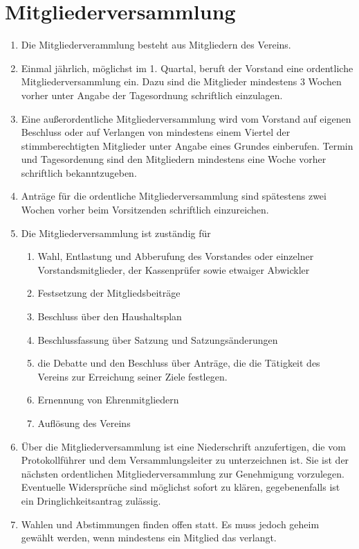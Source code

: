 \documentclass[11pt]{article}
\begin{document}
\section{Mitgliederversammlung}
\begin{enumerate}[label=\arabic*)]
	\item Die Mitgliederverammlung besteht aus Mitgliedern des Vereins.
	\item Einmal jährlich, möglichst im 1. Quartal, beruft der Vorstand eine ordentliche Mitgliederversammlung ein. Dazu sind die Mitglieder mindestens 3 Wochen vorher unter Angabe der Tagesordnung schriftlich einzulagen.
	\item Eine außerordentliche Mitgliederversammlung wird vom Vorstand auf eigenen Beschluss oder auf Verlangen von mindestens einem Viertel der stimmberechtigten Mitglieder unter Angabe eines Grundes einberufen. Termin und Tagesordenung sind den Mitgliedern mindestens eine Woche vorher schriftlich bekanntzugeben.
	\item Anträge für die ordentliche Mitgliederversammlung sind spätestens zwei Wochen vorher beim Vorsitzenden schriftlich einzureichen.
	\item Die Mitgliederversammlung ist zuständig für
	\begin{enumerate}[label=\alph*)]
		\item Wahl, Entlastung und Abberufung des Vorstandes oder einzelner Vorstandsmitglieder, der Kassenprüfer sowie etwaiger Abwickler
		\item Festsetzung der Mitgliedsbeiträge
		\item Beschluss über den Haushaltsplan
		\item Beschlussfassung über Satzung und Satzungsänderungen
		\item die Debatte und den Beschluss über Anträge, die die Tätigkeit des Vereins zur Erreichung seiner Ziele festlegen.
		\item Ernennung von Ehrenmitgliedern
		\item Auflösung des Vereins		
	\end{enumerate}
	\item Über die Mitgliederversammlung ist eine Niederschrift anzufertigen, die vom Protokollführer und dem Versammlungsleiter zu unterzeichnen ist. Sie ist der nächsten ordentlichen Mitgliederversammlung zur Genehmigung vorzulegen. Eventuelle Widersprüche sind möglichst sofort zu klären, gegebenenfalls ist ein Dringlichkeitsantrag zulässig.
	\item Wahlen und Abstimmungen finden offen statt. Es muss jedoch geheim gewählt werden, wenn mindestens ein Mitglied das verlangt.

\end{enumerate}
\end{document}

